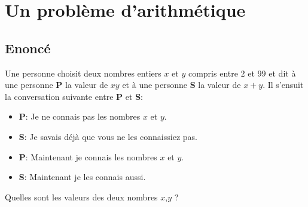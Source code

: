 \documentclass{article}
\newenvironment{statement}{\subsection{Enoncé}}{\pagebreak}
\begin{document}
\section{Un problème d'arithmétique}
\begin{statement}
Une personne choisit deux nombres entiers $x$ et $y$ compris entre $2$ et $99$ et dit à une personne {\bf P} la valeur de $xy$ et à une personne {\bf S} la valeur de $x+y$. Il s'ensuit la conversation suivante entre {\bf P} et {\bf S}:
\begin{itemize}
\item {\bf P}: Je ne connais pas les nombres $x$ et $y$.
\item {\bf S}: Je savais déjà que vous ne les connaissiez pas.
\item {\bf P}: Maintenant je connais les nombres $x$ et $y$.
\item {\bf S}: Maintenant je les connais aussi.
\end{itemize}
Quelles sont les valeurs des deux nombres $x$,$y$ ?
\end{statement}
\end{document}
